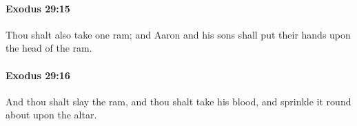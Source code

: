 		\paragraph{Exodus 29:15} %
			\label{EXODUS-29-15}

			Thou shalt also take one ram; and Aaron and his sons shall put their hands upon the head of the ram.


		\paragraph{Exodus 29:16} %
			\label{EXODUS-29-16}

			And thou shalt slay the ram, and thou shalt take his blood, and sprinkle it round about upon the altar.


